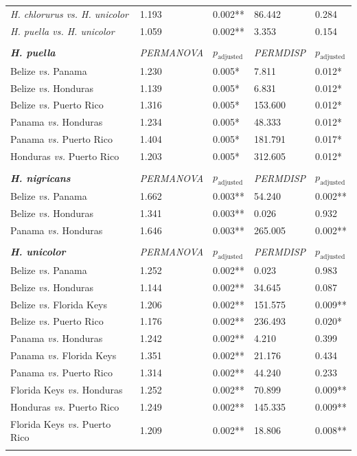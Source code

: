 \begin{xltabular}{\textwidth}{p{4.5cm}*{4}{X}}
\emph{H. chlorurus vs. H. unicolor} & 1.193 & 0.002** & 86.442 & 0.284 \\
\emph{H. puella vs. H. unicolor} & 1.059 & 0.002** & 3.353 & 0.154 \\\\
\hline \hline
\addlinespace
\textbf{\textit{H. puella}} & \emph{PERMANOVA} & $p_{\text{adjusted}}$ & \emph{PERMDISP} & $p_{\text{adjusted}}$ \\
\addlinespace
\hline \hline
Belize \emph{vs.} Panama & 1.230 & 0.005* & 7.811 & 0.012* \\
Belize \emph{vs.} Honduras & 1.139 & 0.005* & 6.831 & 0.012* \\
Belize \emph{vs.} Puerto Rico & 1.316 & 0.005* & 153.600 & 0.012* \\
Panama \emph{vs.} Honduras & 1.234 & 0.005* & 48.333 & 0.012* \\
Panama \emph{vs.} Puerto Rico & 1.404 & 0.005* & 181.791 & 0.017* \\
Honduras \emph{vs.} Puerto Rico & 1.203 & 0.005* & 312.605 & 0.012* \\\\
\hline \hline
\addlinespace
\textbf{\textit{H. nigricans}} & \emph{PERMANOVA} & $p_{\text{adjusted}}$ & \emph{PERMDISP} & $p_{\text{adjusted}}$ \\
\addlinespace
\hline \hline
Belize \emph{vs.} Panama & 1.662 & 0.003** & 54.240 & 0.002** \\
Belize \emph{vs.} Honduras & 1.341 & 0.003** & 0.026 & 0.932 \\
Panama \emph{vs.} Honduras & 1.646 & 0.003** & 265.005 & 0.002** \\\\
\hline \hline
\addlinespace
\textbf{\textit{H. unicolor}} & \emph{PERMANOVA} & $p_{\text{adjusted}}$ & \emph{PERMDISP} & $p_{\text{adjusted}}$ \\
\addlinespace
\hline \hline
Belize \emph{vs.} Panama & 1.252 & 0.002** & 0.023 & 0.983 \\
Belize \emph{vs.} Honduras & 1.144 & 0.002** & 34.645 & 0.087 \\
Belize \emph{vs.} Florida Keys & 1.206 & 0.002** & 151.575 & 0.009** \\
Belize \emph{vs.} Puerto Rico & 1.176 & 0.002** & 236.493 & 0.020* \\
Panama \emph{vs.} Honduras & 1.242 & 0.002** & 4.210 & 0.399 \\
Panama \emph{vs.} Florida Keys & 1.351 & 0.002** & 21.176 & 0.434 \\
Panama \emph{vs.} Puerto Rico & 1.314 & 0.002** & 44.240 & 0.233 \\
Florida Keys \emph{vs.} Honduras & 1.252 & 0.002** & 70.899 & 0.009** \\
Honduras \emph{vs.} Puerto Rico & 1.249 & 0.002** & 145.335 & 0.009** \\
Florida Keys \emph{vs.} Puerto Rico & 1.209 & 0.002** & 18.806 & 0.008** \\
\addlinespace
\hline
\end{xltabular}